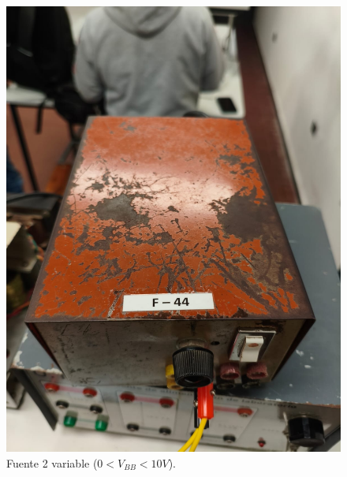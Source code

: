 \documentclass[chaptersright]{informeutn}
\begin{document}
\begin{figure}[H]
\begin{minipage}{0.40\textwidth}
          \includegraphics[width=\textwidth]{pictures/fuente2.jpeg}
          \caption{Fuente 2 variable ($0< V_{BB}<10V$).}
          \label{fig:fuente2}
        \end{minipage}
        \hfill
        \begin{minipage}{0.40\textwidth}
          \centering

\end{minipage}
\end{figure}
\end{document}
